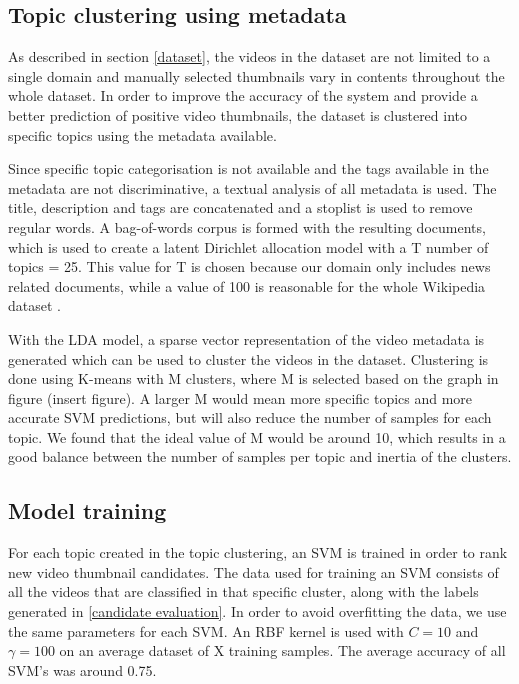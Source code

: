 \documentclass{../resources/sig-alternate-05-2015}
\begin{document}
\subsection{Topic clustering using metadata}
\label{topic clustering}

As described in section \ref{dataset}, the videos in the dataset are not limited to a single domain and manually selected thumbnails vary in contents throughout the whole dataset. In order to improve the accuracy of the system and provide a better prediction of positive video thumbnails, the dataset is clustered into specific topics using the metadata available.

Since specific topic categorisation is not available and the tags available in the metadata are not discriminative, a textual analysis of all metadata is used. The title, description and tags are concatenated and a stoplist is used to remove regular words. A bag-of-words corpus is formed with the resulting documents, which is used to create a latent Dirichlet allocation model with a T number of topics = 25. This value for T is chosen because our domain only includes news related documents, while a value of 100 is reasonable for the whole Wikipedia dataset \cite{Newman:2009uk,Blei:2003tn}.

With the LDA model, a sparse vector representation of the video metadata is generated which can be used to cluster the videos in the dataset. Clustering is done using K-means with M clusters, where M is selected based on the graph in figure (insert figure). A larger M would mean more specific topics and more accurate SVM predictions, but will also reduce the number of samples for each topic. We found that the ideal value of M would be around 10, which results in a good balance between the number of samples per topic and inertia of the clusters.



\subsection{Model training}
\label{model training}

For each topic created in the topic clustering, an SVM is trained in order to rank new video thumbnail candidates. The data used for training an SVM consists of all the videos that are classified in that specific cluster, along with the labels generated in \ref{candidate evaluation}. In order to avoid overfitting the data, we use the same parameters for each SVM. An RBF kernel is used with $C = 10$ and $\gamma = 100$ on an average dataset of X training samples. The average accuracy of all SVM's was around 0.75.
\end{document}
